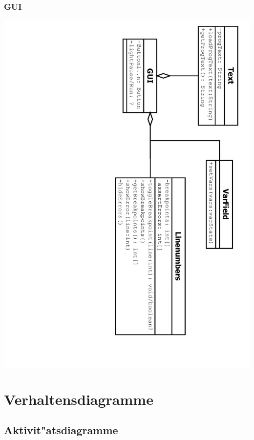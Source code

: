 \documentclass[10pt,a4paper,titlepage]{article}
\begin{document}
\subsubsection{GUI}
\includegraphics[angle=90, scale=0.6]{images/ClassGui.pdf}

\section{Verhaltensdiagramme}
\subsection{Aktivit"atsdiagramme}
\end{document}
